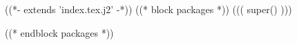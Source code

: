 ((*- extends 'index.tex.j2' -*))
((* block packages *))
((( super() )))

\setmonofont{DejaVu Sans Mono}
((* endblock packages *))

